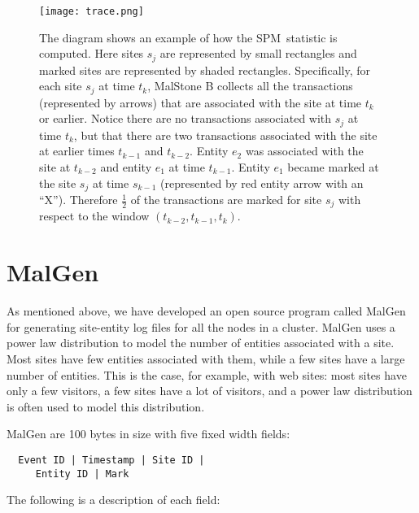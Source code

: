 \documentclass{acm_proc_article-sp}
\def\spm{\mbox{SPM}}
\def\malstone{MalStone } \def\malgen{MalGen }
\begin{document}
\begin{figure*}
\centering
\texttt{[image: trace.png]}
\caption{The diagram shows an example of how the \spm\ statistic
is computed.   Here sites $s_j$ are represented by small
  rectangles and marked sites are represented by shaded
  rectangles.  Specifically, for each site $s_j$ at time $t_k$,
  \malstone B collects all the transactions (represented by arrows)
  that are associated with the site at time $t_k$ or earlier. Notice
  there are no transactions associated with $s_j$ at time $t_k$, but
  that there are two transactions associated with the site at earlier
  times $t_{k-1}$ and $t_{k-2}$.  Entity $e_2$ was associated with the
  site at $t_{k-2}$ and entity $e_1$ at time $t_{k-1}$.  Entity $e_1$
  became marked at the site $s_j$ at time $s_{k-1}$ (represented
  by red entity arrow with an ``X''). Therefore $\frac{1}{2}$ of the
  transactions are marked for site $s_j$ with respect to the
  window $(t_{k-2} , t_{k-1} , t_k)$.}
\label{figure:example}
\end{figure*}



\vfill
\section{\malgen }
\label{section:malgen}
As mentioned above, we have developed an open source program called
\malgen for generating site-entity log files for all the nodes in a
cluster.  \malgen uses a power law distribution to model the number of
entities associated with a site.  Most sites have few entities
associated with them, while a few sites have a large number of
entities.  This is the case, for example, with web sites: most sites
have only a few visitors, a few sites have a lot of visitors, and a
power law distribution is often used to model this distribution.

MalGen are 100 bytes in size with five fixed width fields:
\begin{verbatim}
  Event ID | Timestamp | Site ID | 
     Entity ID | Mark 
\end{verbatim}
The following is a description of each field:
\end{document}
